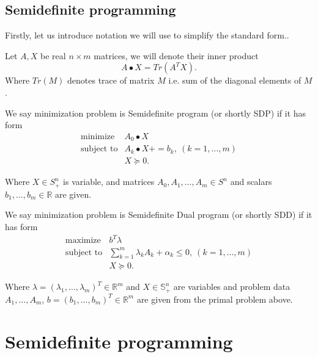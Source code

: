 \documentclass[10pt,oneside]{book}
\theoremstyle{definition}
\begin{document}


\subsection{Semidefinite programming}


Firstly, let us introduce notation we will use to simplify the standard form..

 Let $A,X$ be real $n\times m$ matrices, we will denote their inner product 
$$A\bullet X = Tr(A^TX).$$
Where $Tr(M)$ denotes trace of matrix $M$ i.e. sum of the diagonal elements of $M$.

\label{defSDP}
We say minimization problem is Semidefinite program (or shortly SDP) if it has form
\begin{equation}
\label{sdp} 
\begin{array}{ll}
\mbox{minimize} & A_0\bullet X \\
\mbox{subject to}& A_k\bullet X + = b_k, \ (k = 1,\dots ,m) \\
& X \succeq 0.
\end{array} \tag{SDP}
\end{equation}

Where $X\in S^n_+$ is variable, and matrices $A_0 , A_1,\dots , A_m \in S^n$ and scalars $b_1,\dots, b_m \in \mathbb{R}$ are given.



We say minimization problem is Semidefinite Dual program (or shortly SDD) if it has form
\begin{equation}
\label{sdd} 
\begin{array}{ll}
\mbox{maximize} & b^T\lambda \\
\mbox{subject to}& \sum_{k=1}^m \lambda_kA_k + \alpha_k \leq 0, \ (k = 1,\dots ,m) \\
& X \succeq 0.
\end{array} \tag{SDD}
\end{equation}


Where $\lambda = (\lambda_1,\dots ,\lambda_m)^T\in \mathbb{R}^m$ and $X\in \mathbb{S}^n_+$ are variables and problem data $A_1,\dots ,A_m$, $b = (b_1,\dots ,b_m)^T\in \mathbb{R}^m$ are given from the primal problem above.



\section{Semidefinite programming}
\end{document}
